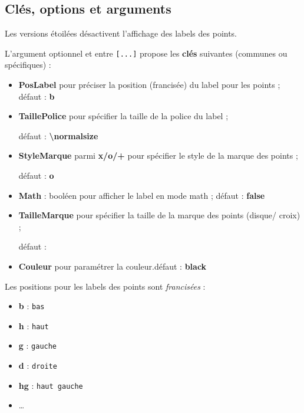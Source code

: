 \documentclass[french,a4paper,11pt]{article}
\newcommand\Cle[1]{{\bfseries\sffamily\textlangle #1\textrangle}}
\newcommand\cmaj[1]{\tcbox[vignetteMaJ]{#1}\xspace}
\begin{document}
\subsection{Clés, options et arguments}

\begin{tipblock}
Les versions étoilées désactivent l'affichage des labels des points.

\smallskip

L'argument optionnel et entre \texttt{[...]} propose les \Cle{clés} suivantes (communes ou spécifiques) :

\begin{itemize}
	\item \Cle{PosLabel} pour préciser la position (francisée) du label pour les points ; \hfill{}défaut : \Cle{b}
	\item \cmaj{0.1.1} \Cle{TaillePolice} pour spécifier la taille de la police du label ;
	
	\hfill{}défaut : \Cle{\textbackslash normalsize}
	\item \Cle{StyleMarque} parmi \Cle{x/o/+} pour spécifier le style de la marque des points ;
	
	\hfill{}défaut : \Cle{o}
	\item \Cle{Math} : booléen pour afficher le label en mode math ; \hfill{}défaut : \Cle{false}
	\item \Cle{TailleMarque} pour spécifier la taille de la marque des points (disque/ croix) ;
	
	\hfill{}défaut : \Cle{2pt}
	\item \Cle{Couleur} pour paramétrer la couleur.\hfill{}défaut : \Cle{black}
\end{itemize}
\vspace*{-\baselineskip}\leavevmode
\end{tipblock}

\begin{tipblock}
Les positions pour les labels des points sont \textit{francisées} :

\begin{itemize}
	\item \Cle{b} : \texttt{bas}
	\item \Cle{h} : \texttt{haut}
	\item \Cle{g} : \texttt{gauche}
	\item \Cle{d} : \texttt{droite}
	\item \Cle{hg} : \texttt{haut gauche}
	\item \ldots
\end{itemize}
\vspace*{-\baselineskip}\leavevmode
\end{tipblock}
\end{document}
